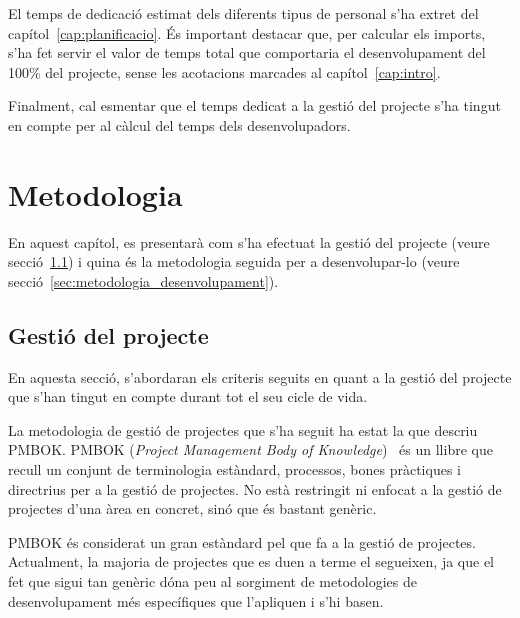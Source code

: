 \documentclass[a4paper,12pt]{ThesisStyle}
\begin{document}
El temps de dedicació estimat dels diferents tipus de personal s'ha extret del capítol~\ref{cap:planificacio}. És important destacar que, per calcular els imports, s'ha fet servir el valor de temps total que comportaria el desenvolupament del 100\% del projecte, sense les acotacions marcades al capítol~\ref{cap:intro}.

Finalment, cal esmentar que el temps dedicat a la gestió del projecte s'ha tingut en compte per al càlcul del temps dels desenvolupadors.


\chapter{Metodologia}
\label{cap:metodologia}

En aquest capítol, es presentarà com s'ha efectuat la gestió del projecte (veure secció~\ref{sec:gestio_projecte}) i quina és la metodologia seguida per a desenvolupar-lo (veure secció~\ref{sec:metodologia_desenvolupament}).

\section{Gestió del projecte}
\label{sec:gestio_projecte}

En aquesta secció, s'abordaran els criteris seguits en quant a la gestió del projecte que s'han tingut en compte durant tot el seu cicle de vida.

La metodologia de gestió de projectes que s'ha seguit ha estat la que descriu PMBOK. PMBOK (\textit{Project Management Body of Knowledge})~\cite{PMBOK} és un llibre que recull un conjunt de terminologia estàndard, processos, bones pràctiques i directrius per a la gestió de projectes. No està restringit ni enfocat a la gestió de projectes d'una àrea en concret, sinó que és bastant genèric.

PMBOK és considerat un gran estàndard pel que fa a la gestió de projectes. Actualment, la majoria de projectes que es duen a terme el segueixen, ja que el fet que sigui tan genèric dóna peu al sorgiment de metodologies de desenvolupament més específiques que l'apliquen i s'hi basen.
\end{document}
